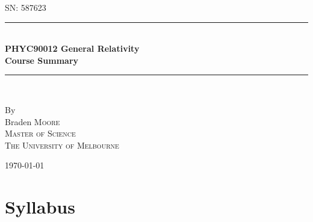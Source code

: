 \documentclass[a4paper]{article} %
\begin{document}
\pagestyle{empty}

\newcommand{\HRule}{\rule{\linewidth}{0.5mm}}

\begin{titlepage}

    \begin{center}
        \textsc{\large SN: 587623}\\[6cm]

        \HRule \\[0.5cm]
		\Huge \textbf{PHYC90012 General Relativity}\\[0.5cm]
        \huge \textbf{Course Summary}\\[0.5cm] 
        \HRule \\[1.5cm]
        \begin{minipage}{0.4\textwidth}
        \begin{center}

        \large By \\[0.75cm]
        \huge Braden \scshape Moore \\[0.5cm]
        \normalsize \normalfont Master of Science \\
        The University of Melbourne \\

        \end{center}
        \end{minipage}

        \vfill

        \large \today
    \end{center}


\newpage
\end{titlepage}
\pagestyle{empty}

\pagestyle{fancy}
\lfoot{\textsc{\today}}
\setcounter{page}{1}
\section{Syllabus}
\end{document}
